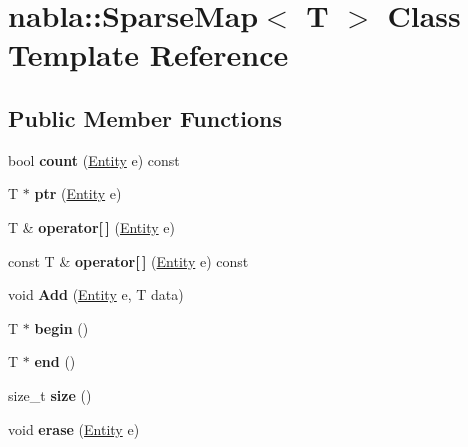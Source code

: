 \hypertarget{classnabla_1_1_sparse_map}{}\section{nabla\+::Sparse\+Map$<$ T $>$ Class Template Reference}
\label{classnabla_1_1_sparse_map}
\subsection*{Public Member Functions}
\begin{DoxyCompactItemize}
\item 
\mbox{\label{classnabla_1_1_sparse_map_a6777b65d41fd9c31ebf54804c23e8f60}} 
bool {\bfseries count} (\mbox{\hyperlink{structnabla_1_1_entity}{Entity}} e) const
\item 
\mbox{\label{classnabla_1_1_sparse_map_a1c0d849e1162ff5299965bc1e7f853ec}} 
T $\ast$ {\bfseries ptr} (\mbox{\hyperlink{structnabla_1_1_entity}{Entity}} e)
\item 
\mbox{\label{classnabla_1_1_sparse_map_ab9c5095117652f236ea84f485a8a8db5}} 
T \& {\bfseries operator\mbox{[}$\,$\mbox{]}} (\mbox{\hyperlink{structnabla_1_1_entity}{Entity}} e)
\item 
\mbox{\label{classnabla_1_1_sparse_map_ad0e0818bdf1808cc6e5817745b038cb9}} 
const T \& {\bfseries operator\mbox{[}$\,$\mbox{]}} (\mbox{\hyperlink{structnabla_1_1_entity}{Entity}} e) const
\item 
\mbox{\label{classnabla_1_1_sparse_map_a5e6d09b44ac166a59c7eeaf5858fa2c3}} 
void {\bfseries Add} (\mbox{\hyperlink{structnabla_1_1_entity}{Entity}} e, T data)
\item 
\mbox{\label{classnabla_1_1_sparse_map_a7311f6c4cf048885a4bf94d7d6cea958}} 
T $\ast$ {\bfseries begin} ()
\item 
\mbox{\label{classnabla_1_1_sparse_map_ab927ce22087795bee5c7081d5fe6bb2b}} 
T $\ast$ {\bfseries end} ()
\item 
\mbox{\label{classnabla_1_1_sparse_map_a4a07f4ea96954fd364d6f6158867c77f}} 
size\+\_\+t {\bfseries size} ()
\item 
\mbox{\label{classnabla_1_1_sparse_map_a6d75777216ecfbaf6a0485ba9073b16f}} 
void {\bfseries erase} (\mbox{\hyperlink{structnabla_1_1_entity}{Entity}} e)
\end{DoxyCompactItemize}


